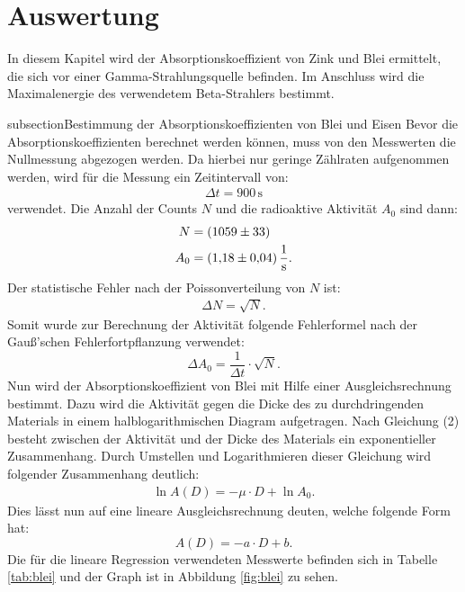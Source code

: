 \section{Auswertung}
\label{sec:Auswertung}
In diesem Kapitel wird der Absorptionskoeffizient von Zink und Blei ermittelt, die sich vor einer Gamma-Strahlungsquelle befinden. Im Anschluss
wird die Maximalenergie des verwendetem Beta-Strahlers bestimmt.

subsection{Bestimmung der Absorptionskoeffizienten von Blei und Eisen}
Bevor die Absorptionskoeffizienten berechnet werden können, muss von den Messwerten die Nullmessung abgezogen werden. Da hierbei nur geringe Zählraten
aufgenommen werden, wird für die Messung ein Zeitintervall von:
\begin{align*}
\Delta t = 900\,\si{\second}
\end{align*}
verwendet. Die Anzahl der Counts $N$ und die radioaktive Aktivität $A_0$ sind dann:
\begin{align*}
N &= (\num{1059 +- 33}) \\
A_0 &= (\num{1,18 +- 0,04})\,\frac{1}{\si{\second}}.
\end{align*}
Der statistische Fehler nach der Poissonverteilung von $N$ ist:
\begin{align*}
  \Delta N = \sqrt{N}.
\end{align*}
Somit wurde zur Berechnung der Aktivität folgende Fehlerformel nach der Gauß'schen Fehlerfortpflanzung verwendet:
\begin{equation}
\Delta A_0 = \frac{1}{\Delta t} \cdot \sqrt{N}.
\end{equation}
Nun wird der Absorptionskoeffizient von Blei mit Hilfe einer Ausgleichsrechnung bestimmt. Dazu wird die Aktivität gegen die Dicke des zu durchdringenden Materials
in einem halblogarithmischen Diagram aufgetragen. Nach Gleichung (2) besteht zwischen der Aktivität und der Dicke des Materials ein exponentieller
Zusammenhang. Durch Umstellen und Logarithmieren dieser Gleichung wird folgender Zusammenhang deutlich:
\begin{align*}
\ln{A(D)} = - \mu \cdot D + \ln{A_0}.
\end{align*}
Dies lässt nun auf eine lineare Ausgleichsrechnung deuten, welche folgende Form hat:
\begin{equation}
\label{eqn:ausgleich1}
A(D) = - a \cdot D + b.
\end{equation}
Die für die lineare Regression verwendeten Messwerte befinden sich in Tabelle \ref{tab:blei} und der Graph ist in Abbildung \ref{fig:blei} zu sehen.
